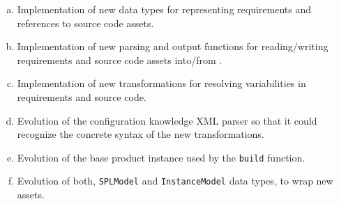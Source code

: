 \begin{enumerate}[(a)]

\item Implementation of new data types for representing requirements
  and references to source code assets.

\item Implementation of new parsing and output functions for
  reading/writing requirements and source code assets into/from \hp.

\item Implementation of new transformations for resolving
  variabilities in requirements and source code.

\item Evolution of the configuration knowledge XML parser so that it
  could recognize the concrete syntax of the new transformations.

\item Evolution of the base product instance used by the \texttt{build}
  function.

\item Evolution of both, \texttt{SPLModel} and \texttt{InstanceModel}
  data types, to wrap new assets.

\end{enumerate}


